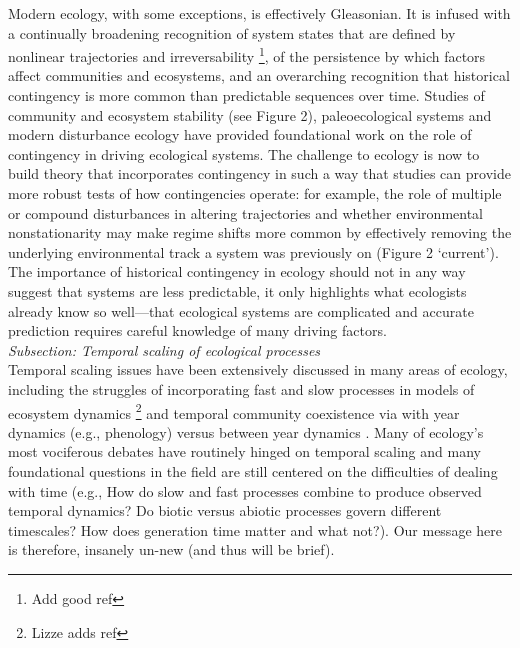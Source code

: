 \documentclass[11pt,a4paper,oneside]{article}
\begin{document}
Modern ecology, with some exceptions, is effectively Gleasonian.  It is infused with a continually broadening recognition of system states that are defined by nonlinear trajectories and irreversability \footnote{Add good ref}, of the persistence by which factors affect communities and ecosystems, and an overarching recognition that historical contingency is more common than predictable sequences over time. Studies of community and ecosystem stability (see Figure 2), paleoecological systems and modern disturbance ecology have provided foundational work on the role of contingency in driving ecological systems. The challenge to ecology is now to build theory that incorporates contingency in such a way that studies can provide more robust tests of how contingencies operate: for example, the role of multiple or compound disturbances in altering trajectories and whether environmental nonstationarity may make regime shifts more common by effectively removing the underlying environmental track a system was previously on (Figure 2 `current'). The importance of historical contingency in ecology should not in any way suggest that systems are less predictable, it only highlights what ecologists already know so well---that ecological systems are complicated and accurate prediction requires careful knowledge of many driving factors. \\

\noindent \emph{Subsection: Temporal scaling of ecological processes}\\
Temporal scaling issues have been extensively discussed in many areas of ecology, including the struggles of incorporating fast and slow processes in models of ecosystem dynamics \footnote{Lizze adds ref} and temporal community coexistence via with year dynamics (e.g., phenology) versus between year dynamics \citep{Chesson:1997dz}. Many of ecology's most vociferous debates have routinely hinged on temporal scaling \citep{wiens1986} and many foundational questions in the field are still centered on the difficulties of dealing with time (e.g., How do slow and fast processes combine to produce observed temporal dynamics? Do biotic versus abiotic processes govern different timescales? How does generation time matter and what not?). Our message here is therefore, insanely un-new (and thus will be brief). \\
\end{document}
